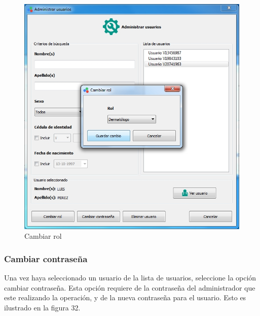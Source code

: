\begin{figure}[H]
  \centering
  \includegraphics[width=1\linewidth]{./img/administrar-rol.jpg}
\caption{Cambiar rol}
\end{figure}
		
		\subsubsection{Cambiar contrase\~{n}a}
		
		Una vez haya seleccionado un usuario de la lista de usuarios, seleccione la opci\'{o}n cambiar contrase\~{n}a. Esta opci\'{o}n requiere de la contrase\~{n}a del administrador que este realizando la operaci\'{o}n, y de la nueva contrase\~{n}a para el usuario. Esto es ilustrado en la figura 32.
		
